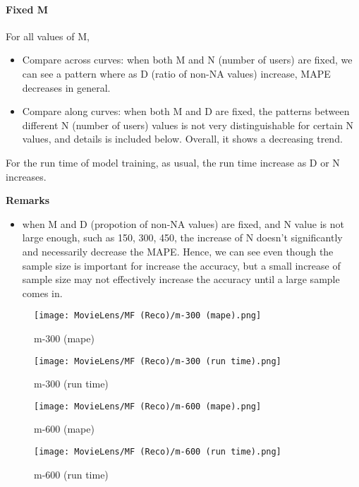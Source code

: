 \documentclass[12pt]{article}
\begin{document}
\paragraph{Fixed M}
For all values of M, 
\begin{itemize}
\item Compare across curves:
when both M and N (number of users) are fixed, we can see a pattern where as D (ratio of non-NA values) increase, MAPE decreases in general.

\item Compare along curves:
when both M and D are fixed, the patterns between different N (number of users) values is not very distinguishable for certain N values, and details is included below. Overall, it shows a decreasing trend.
\end{itemize}

For the run time of model training, as usual, the run time increase as D or N increases.

\linebreak
\textbf{Remarks}

\begin{itemize}
    \item when M and D (propotion of non-NA values) are fixed, and N value is not large enough, such as 150, 300, 450, the increase of N doesn't significantly and necessarily decrease the MAPE. Hence, we can see even though the sample size is important for increase the accuracy, but a small increase of sample size may not effectively increase the accuracy until a large sample comes in. 
\end{itemize}

\begin{figure}[H]
\centering
    \begin{minipage}{0.45\textwidth}
        \centering
        \texttt{[image: MovieLens/MF (Reco)/m-300 (mape).png]}
        \caption{m-300 (mape)}
        
    \end{minipage}\hfill
    \begin{minipage}{0.45\textwidth}
        \centering
        \texttt{[image: MovieLens/MF (Reco)/m-300 (run time).png]}
        \caption{m-300 (run time)}
    \end{minipage}
\end{figure}

\begin{figure}[H]
\centering
    \begin{minipage}{0.45\textwidth}
        \centering
        \texttt{[image: MovieLens/MF (Reco)/m-600 (mape).png]}
        \caption{m-600 (mape)}
        
    \end{minipage}\hfill
    \begin{minipage}{0.45\textwidth}
        \centering
        \texttt{[image: MovieLens/MF (Reco)/m-600 (run time).png]}
        \caption{m-600 (run time)}
    \end{minipage}
\end{figure}
\end{document}
